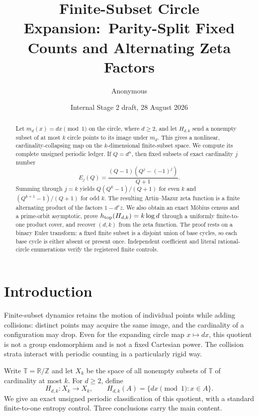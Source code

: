 \documentclass[11pt,a4paper]{amsart}
\title[Finite-subset circle expansion]{Finite-Subset Circle Expansion:\
Parity-Split Fixed Counts and Alternating Zeta Factors}
\author{Anonymous}
\date{Internal Stage 2 draft, 28 August 2026}
\theoremstyle{definition}
\theoremstyle{remark}
\newcommand{\T}{\mathbb T}
\begin{document}
\begin{abstract}
Let $m_d(x)=dx\pmod 1$ on the circle, where $d\geq2$, and let
$H_{d,k}$ send a nonempty subset of at most $k$ circle points to its image
under $m_d$.  This gives a nonlinear, cardinality-collapsing map on the
$k$-dimensional finite-subset space.  We compute its complete unsigned
periodic ledger.  If $Q=d^n$, then fixed subsets of exact cardinality $j$
number
\[
 E_j(Q)=\frac{(Q-1)(Q^j-(-1)^j)}{Q+1}.
\]
Summing through $j=k$ yields $Q(Q^k-1)/(Q+1)$ for even $k$ and
$(Q^{k+1}-1)/(Q+1)$ for odd $k$.  The resulting Artin--Mazur zeta function
is a finite alternating product of the factors $1-d^r z$.  We also obtain
an exact M\"obius census and a prime-orbit asymptotic, prove
$h_{\rm top}(H_{d,k})=k\log d$ through a uniformly finite-to-one product
cover, and recover $(d,k)$ from the zeta function.  The proof rests on a
binary Euler transform: a fixed finite subset is a disjoint union of base
cycles, so each base cycle is either absent or present once.  Independent
coefficient and literal rational-circle enumerations verify the registered
finite controls.
\end{abstract}

\maketitle

\section{Introduction}

Finite-subset dynamics retains the motion of individual points while adding
collisions: distinct points may acquire the same image, and the cardinality
of a configuration may drop.  Even for the expanding circle map
$x\mapsto dx$, this quotient is not a group endomorphism and is not a fixed
Cartesian power.  The collision strata interact with periodic counting in a
particularly rigid way.

Write $\T=\mathbb R/\mathbb Z$ and let $X_k$ be the space of all nonempty
subsets of $\T$ of cardinality at most $k$.  For $d\geq2$, define
\[
 H_{d,k}:X_k\longrightarrow X_k,
 \qquad H_{d,k}(A)=\{dx\pmod1:x\in A\}.
\]
We give an exact unsigned periodic classification of this quotient, with a
standard finite-to-one entropy control.  Three conclusions carry the main
content.
\end{document}
